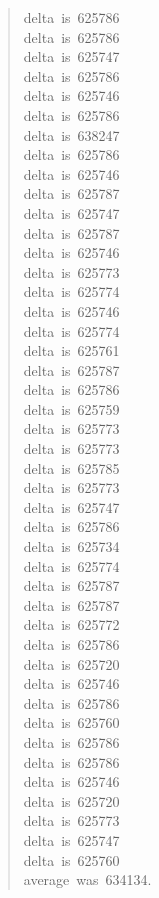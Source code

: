 \documentclass[letterpaper]{article}
\begin{document}
\begin{quote}
{delta~is~625786\\
delta~is~625786\\
delta~is~625747\\
delta~is~625786\\
delta~is~625746\\
delta~is~625786\\
delta~is~638247\\
delta~is~625786\\
delta~is~625746\\
delta~is~625787\\
delta~is~625747\\
delta~is~625787\\
delta~is~625746\\
delta~is~625773\\
delta~is~625774\\
delta~is~625746\\
delta~is~625774\\
delta~is~625761\\
delta~is~625787\\
delta~is~625786\\
delta~is~625759\\
delta~is~625773\\
delta~is~625773\\
delta~is~625785\\
delta~is~625773\\
delta~is~625747\\
delta~is~625786\\
delta~is~625734\\
delta~is~625774\\
delta~is~625787\\
delta~is~625787\\
delta~is~625772\\
delta~is~625786\\
delta~is~625720\\
delta~is~625746\\
delta~is~625786\\
delta~is~625760\\
delta~is~625786\\
delta~is~625786\\
delta~is~625746\\
delta~is~625720\\
delta~is~625773\\
delta~is~625747\\
delta~is~625760\\
average~was~634134.\\
}
\end{quote}
\end{document}
